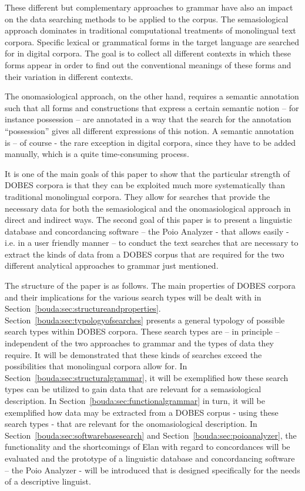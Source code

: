 These different but complementary approaches to grammar have also an impact on the data searching methods to be applied to the corpus. The semasiological approach dominates in traditional computational treatments of monolingual text corpora. Specific lexical or grammatical forms in the target language are searched for in digital corpora. The goal is to collect all different contexts in which these forms appear in order to find out the conventional meanings of these forms and their variation in different contexts. 

The onomasiological approach, on the other hand, requires a semantic annotation such that all forms and constructions that express a certain semantic notion -- for instance possession -- are annotated in a way that the search for the annotation ``possession'' gives all different expressions of this notion. A semantic annotation is -- of course - the rare exception in digital corpora, since they have to be added manually, which is a quite time-consuming process. 

It is one of the main goals of this paper to show that the particular strength of DOBES corpora is that they can be exploited much more systematically than traditional monolingual corpora. They allow for searches that provide the necessary data for both the semasiological and the onomasiological approach in direct and indirect ways. The second goal of this paper is to present a linguistic database and concordancing software -- the Poio Analyzer - that allows easily - i.e. in a user friendly manner -- to conduct the text searches that are necessary to extract the kinds of data from a DOBES corpus that are required for the two different analytical approaches to grammar just mentioned. 

The structure of the paper is as follows. The main properties of DOBES corpora and their implications for the various search types will be dealt with in Section\ \ref{bouda:sec:structureandproperties}. Section\ \ref{bouda:sec:typologyofsearches} presents a general typology of possible search types within DOBES corpora. These search types are -- in principle -- independent of the two approaches to grammar and the types of data they require. It will be demonstrated that these kinds of searches exceed the possibilities that monolingual corpora allow for. In Section\ \ref{bouda:sec:structuralgrammar}, it will be exemplified how these search types can be utilized to gain data that are relevant for a semasiological description. In Section\ \ref{bouda:sec:functionalgrammar}  in turn, it will be exemplified how data may be extracted from a DOBES corpus - using these search types - that are relevant for the onomasiological description. In Section\ \ref{bouda:sec:softwarebasesearch}  and Section\ \ref{bouda:sec:poioanalyzer}, the functionality and the shortcomings of Elan with regard to concordances will be evaluated and the prototype of a linguistic database and concordancing software -- the Poio Analyzer - will be introduced that is designed specifically for the needs of a descriptive linguist.

